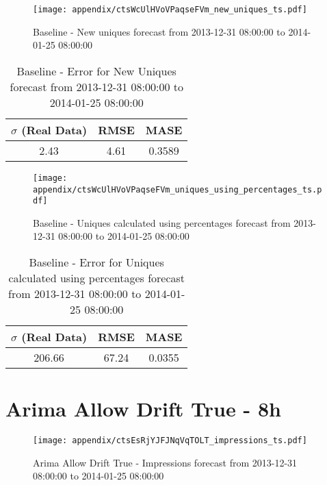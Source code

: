 \begin{figure}[H] \begin{center} \leavevmode
\texttt{[image: appendix/ctsWcUlHVoVPaqseFVm\_new\_uniques\_ts.pdf]} \caption[]{
Baseline - New uniques forecast from 2013-12-31 08:00:00 to 2014-01-25 08:00:00} \label{fig:appendix/ctsWcUlHVoVPaqseFVm_new_uniques_ts.pdf} \end{center}
\end{figure}

\begin{table}[H]
\centering
\footnotesize
\begin{tabular}{ccc}
$\sigma$ (Real Data) & RMSE & MASE   \\ \hline
2.43 & 4.61 & 0.3589 \\
\end{tabular}

\vspace{0.5cm}

\caption[]{
Baseline - Error for New Uniques forecast from 2013-12-31 08:00:00 to 2014-01-25 08:00:00}
\end{table}

\begin{figure}[H] \begin{center} \leavevmode
\texttt{[image: appendix/ctsWcUlHVoVPaqseFVm\_uniques\_using\_percentages\_ts.pdf]} \caption[]{
Baseline - Uniques calculated using percentages forecast from 2013-12-31 08:00:00 to 2014-01-25 08:00:00} \label{fig:appendix/ctsWcUlHVoVPaqseFVm_uniques_using_percentages_ts.pdf} \end{center}
\end{figure}

\begin{table}[H]
\centering
\footnotesize
\begin{tabular}{ccc}
$\sigma$ (Real Data) & RMSE & MASE   \\ \hline
206.66 & 67.24 & 0.0355 \\
\end{tabular}

\vspace{0.5cm}

\caption[]{
Baseline - Error for Uniques calculated using percentages forecast from 2013-12-31 08:00:00 to 2014-01-25 08:00:00}
\end{table}

\section{Arima Allow Drift True - 8h}
\begin{figure}[H] \begin{center} \leavevmode
\texttt{[image: appendix/ctsEsRjYJFJNqVqTOLT\_impressions\_ts.pdf]} \caption[]{
Arima Allow Drift True - Impressions forecast from 2013-12-31 08:00:00 to 2014-01-25 08:00:00} \label{fig:appendix/ctsEsRjYJFJNqVqTOLT_impressions_ts.pdf} \end{center}
\end{figure}

